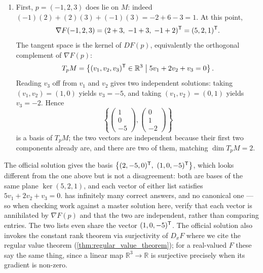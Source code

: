 \begin{exercisesolution}
\begin{enumerate}[label=\textbf{(\alph*)}]
  \item First, $p = (-1,2,3)$ does lie on $M$: indeed $(-1)(2) + (2)(3) + (-1)(3) = -2 + 6 - 3 = 1$.
    At this point,
\[\nabla F(-1,2,3) = (2+3,\; -1+3,\; -1+2)^{\mathsf{T}} = (5, 2, 1)^{\mathsf{T}} .\]
    The tangent space is the kernel of $DF(p)$, equivalently the orthogonal complement of
    $\nabla F(p)$:
\[T_p M = \left\{(v_1, v_2, v_3)^{\mathsf{T}} \in \mathbb{R}^3 \;\middle|\; 5v_1 + 2v_2 + v_3 = 0\right\}.\]
    Reading $v_3$ off from $v_1$ and $v_2$ gives two independent solutions: taking $(v_1,v_2) =
    (1,0)$ yields $v_3 = -5$, and taking $(v_1,v_2) = (0,1)$ yields $v_3 = -2$. Hence
\[\left\{\begin{pmatrix} 1 \\ 0 \\ -5 \end{pmatrix}, \begin{pmatrix} 0 \\ 1 \\ -2 \end{pmatrix}\right\}\]
    is a basis of $T_p M$; the two vectors are independent because their first two components
    already are, and there are two of them, matching $\dim T_p M = 2$.
\end{enumerate}
\begin{ainote}
The official solution gives the basis $\left\{(2,-5,0)\transp,\ (1,0,-5)\transp\right\}$, which
looks different from the one above but is not a disagreement: both are bases of the same plane
$\ker(5,2,1)$, and each vector of either list satisfies $5v_1+2v_2+v_3 = 0$.  has
infinitely many correct answers, and no canonical one --- so when checking work against a master
solution here, verify that each vector is annihilated by $\nabla F(p)$ and that the two are
independent, rather than comparing entries. The two lists even share the vector $(1,0,-5)^{\mathsf{T}}$.
The official solution also invokes the constant rank theorem via surjectivity of $D_xF$ where we
cite the regular value theorem (\cref{thm:regular_value_theorem}); for a real-valued $F$ these say
the same thing, since a linear map $\mathbb{R}^3 \to \mathbb{R}$ is surjective precisely when its
gradient is non-zero.
\end{ainote}
\end{exercisesolution}

